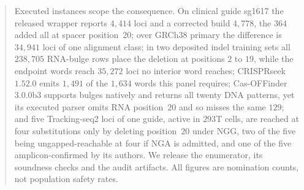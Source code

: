 \documentclass[11pt,letterpaper]{article}
\begin{document}
\begin{abstract}
Executed instances scope the consequence. On clinical guide sg1617 the released wrapper
reports $4{,}414$ loci and a corrected build $4{,}778$, the $364$ added all at spacer
position~$20$; over GRCh38 primary the difference is $34{,}941$ loci of one alignment
class; in two deposited indel training sets all $238{,}705$ RNA-bulge rows place the
deletion at positions $2$ to $19$, while the endpoint words reach $35{,}272$ loci no
interior word reaches; CRISPRseek $1.52.0$ emits $1{,}491$ of the $1{,}634$ words this
panel requires; Cas-OFFinder 3.0.0b3 supports bulges natively and returns all twenty DNA
patterns, yet its executed parser omits RNA position~$20$ and so misses the same $129$; and
five Tracking-seq2 loci of one guide, active in $293$T cells, are reached at four
substitutions only by deleting position~$20$ under NGG, two of the five being
ungapped-reachable at four if NGA is admitted, and one of the five amplicon-confirmed by
its authors. We release
the enumerator, its soundness checks and the audit artifacts. All figures are nomination
counts, not population safety rates.
\end{abstract}
\newpage
\setcounter{page}{1}
\hypersetup{pageanchor=true}


\providecommand{\paperheading}[1]{\section{#1}}
\providecommand{\discsubsec}[1]{\subsection{#1}}
\newif\ifrecombmode \recombmodetrue




\clearpage


\end{document}
